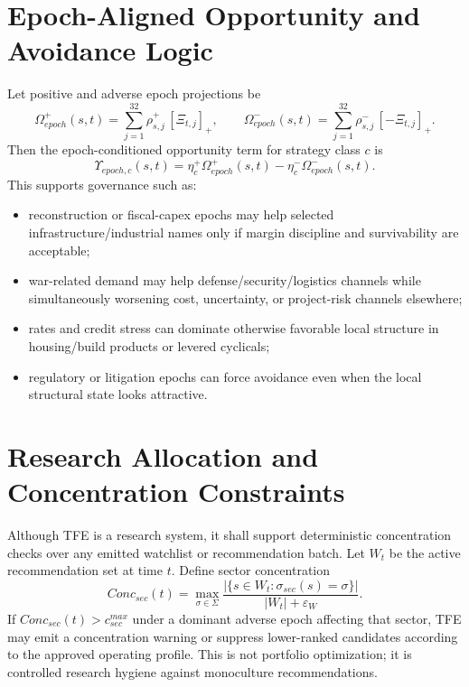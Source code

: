 \section{Epoch-Aligned Opportunity and Avoidance Logic}

Let positive and adverse epoch projections be
\[
\Omega_{epoch}^{+}(s,t)=\sum_{j=1}^{32} \rho^{+}_{s,j}\,[\Xi_{t,j}]_{+},
\qquad
\Omega_{epoch}^{-}(s,t)=\sum_{j=1}^{32} \rho^{-}_{s,j}\,[-\Xi_{t,j}]_{+}.
\]
Then the epoch-conditioned opportunity term for strategy class $c$ is
\[
\Upsilon_{epoch,c}(s,t)=\eta_c^{+}\Omega_{epoch}^{+}(s,t)-\eta_c^{-}\Omega_{epoch}^{-}(s,t).
\]
This supports governance such as:
\begin{itemize}
    \item reconstruction or fiscal-capex epochs may help selected infrastructure/industrial names only if margin discipline and survivability are acceptable;
    \item war-related demand may help defense/security/logistics channels while simultaneously worsening cost, uncertainty, or project-risk channels elsewhere;
    \item rates and credit stress can dominate otherwise favorable local structure in housing/build products or levered cyclicals;
    \item regulatory or litigation epochs can force avoidance even when the local structural state looks attractive.
\end{itemize}

\section{Research Allocation and Concentration Constraints}

Although TFE is a research system, it shall support deterministic concentration checks over any emitted watchlist or recommendation batch. Let $W_t$ be the active recommendation set at time $t$. Define sector concentration
\[
Conc_{sec}(t)=\max_{\sigma\in\Sigma}\frac{|\{s\in W_t:\sigma_{sec}(s)=\sigma\}|}{|W_t|+\varepsilon_W}.
\]
If $Conc_{sec}(t)>c_{sec}^{max}$ under a dominant adverse epoch affecting that sector, TFE may emit a concentration warning or suppress lower-ranked candidates according to the approved operating profile. This is not portfolio optimization; it is controlled research hygiene against monoculture recommendations.

